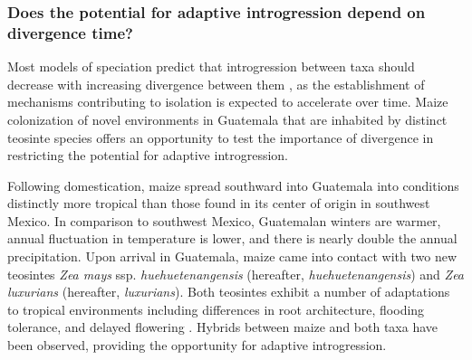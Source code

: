 \subsubsection{Does the potential for adaptive introgression depend on divergence time?}
\label{sss:divergence}
Most models of speciation predict that introgression between taxa should decrease with increasing divergence between them \citep{harrison2014hybridization}, as the establishment of mechanisms contributing to isolation \citep[e.g. postzyogtic isolation; ][]{orr2001evolution} is expected to accelerate over time. Maize colonization of novel environments in Guatemala that are inhabited by distinct teosinte species offers an opportunity to test the importance of divergence in restricting the potential for adaptive introgression.

Following domestication, maize spread southward into Guatemala into conditions distinctly more tropical than those found in its center of origin in southwest Mexico.
In comparison to southwest Mexico, Guatemalan winters are warmer, annual fluctuation in temperature is lower, and there is nearly double the annual precipitation.
Upon arrival in Guatemala, maize came into contact with two new teosintes \emph{Zea mays} ssp. \emph{huehuetenangensis} (hereafter, \emph{huehuetenangensis}) and \emph{Zea luxurians} (hereafter, \emph{luxurians}). 
Both teosintes exhibit a number of adaptations to tropical environments including differences in root architecture, flooding tolerance, and delayed flowering \citep{wilkes1967teosinte, mano2006}.
Hybrids between maize and both taxa \citep{wilkes1967teosinte} have been observed, providing the opportunity for adaptive introgression.  

